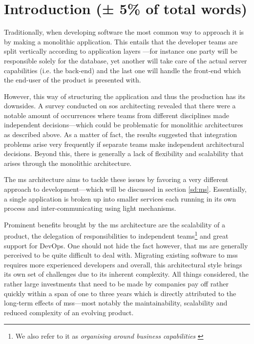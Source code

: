 \section{Introduction (± 5\% of total words)}

Traditionally, when developing software the most common way to
approach it is by making a monolithic application.
\cite{ms-challenges} This entails that the developer teams are split
vertically \cite{ms-challenges} according to application layers
\cite{ms-definition}---for instance one party will be responsible
solely for the database, yet another will take care of the actual
server capabilities (i.e. the back-end) and the last one will handle
the front-end which the end-user of the product is presented with.

However, this way of structuring the application and thus the
production has its downsides. A survey conducted on \gls{sos}
architecting \cite{sos-survey} revealed that there were a notable
amount of occurrences where teams from different disciplines made
independent decisions---which could be problematic for monolithic
architectures as described above. As a matter of fact, the results
suggested that integration problems arise very frequently if separate
teams make independent architectural decisions. \cite{sos-survey}
Beyond this, there is generally a lack of flexibility and scalability
that arises through the monolithic architecture. \cite{ms-challenges}

The \gls{ms} architecture aims to tackle these issues
\cite{ms-challenges} by favoring a very different approach to
development---which will be discussed in section \vref{sd:ms}.
Essentially, a single application is broken up into smaller services
each running in its own process and inter-communicating using light
mechanisms.  \cite{ms-arch-study}

Prominent benefits brought by the \gls{ms} architecture are the
scalability of a product, the delegation of responsibilities to
independent teams\footnote{We also refer to it as \textit{organising
around business capabilities} \cite{ms-definition}} and great support
for DevOps. \cite{ms-migration} One should not hide the fact however,
that \gls{ms} are generally perceived to be quite difficult to deal
with. Migrating existing software to \glspl{ms} requires more
experienced developers and overall, this architectural style brings
its own set of challenges due to its inherent complexity.
\cite{ms-pains-gains} All things considered, the rather large
investments that need to be made by companies pay off rather quickly
within a span of one to three years which is directly attributed to
the long-term effects of \glspl{ms}---most notably the
maintainability, scalability and reduced complexity of an evolving
product. \cite{ms-migration}

